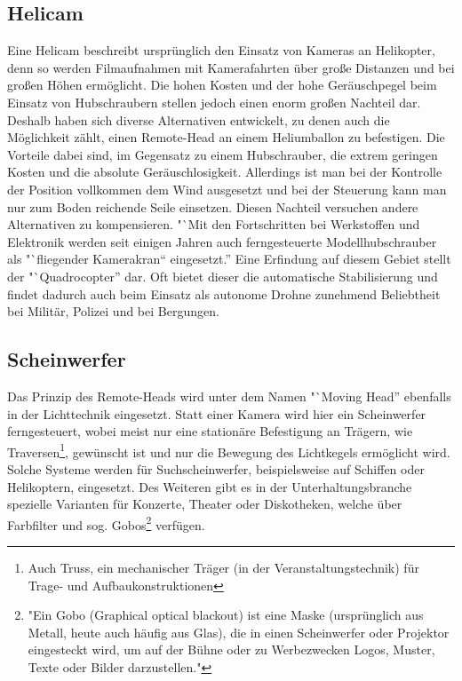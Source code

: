 \documentclass[a4paper, 12pt, bibliography=totocnumbered, listof=numbered]{scrartcl}
\begin{document}
	\subsection{Helicam}
	Eine Helicam beschreibt ursprünglich den Einsatz von Kameras an Helikopter, denn so werden Filmaufnahmen mit Kamerafahrten über große Distanzen und bei großen Höhen ermöglicht. Die hohen Kosten und der hohe Geräuschpegel beim Einsatz von Hubschraubern stellen jedoch einen enorm großen Nachteil dar. Deshalb haben sich diverse Alternativen entwickelt, zu denen auch die Möglichkeit zählt, einen Remote-Head an einem Heliumballon zu befestigen. Die Vorteile dabei sind, im Gegensatz zu einem Hubschrauber, die extrem geringen Kosten und die absolute Geräuschlosigkeit. Allerdings ist man bei der Kontrolle der Position vollkommen dem Wind ausgesetzt und bei der Steuerung kann man nur zum Boden reichende Seile einsetzen. Diesen Nachteil versuchen andere Alternativen zu kompensieren. "`Mit den Fortschritten bei Werkstoffen und Elektronik werden seit einigen Jahren auch ferngesteuerte Modellhubschrauber als "`fliegender Kamerakran“ eingesetzt.”\cite{wikipedia-kamerakran} Eine Erfindung auf diesem Gebiet stellt der "`Quadrocopter” dar. Oft bietet dieser die automatische Stabilisierung und findet dadurch auch beim Einsatz als autonome Drohne zunehmend Beliebtheit bei Militär, Polizei und bei Bergungen.

	\subsection{Scheinwerfer}
	Das Prinzip des Remote-Heads wird unter dem Namen "`Moving Head” ebenfalls in der Lichttechnik eingesetzt. Statt einer Kamera wird hier ein Scheinwerfer ferngesteuert, wobei meist nur eine stationäre Befestigung an Trägern, wie Traversen\footnote{Auch Truss, ein mechanischer Träger (in der Veranstaltungstechnik) für Trage- und Aufbaukonstruktionen\cite{wikipedia-traverse}}, gewünscht ist und nur die Bewegung des Lichtkegels ermöglicht wird. Solche Systeme werden für Suchscheinwerfer, beispielsweise auf Schiffen oder Helikoptern, eingesetzt. Des Weiteren gibt es in der Unterhaltungsbranche spezielle Varianten für Konzerte, Theater oder Diskotheken, welche über Farbfilter und sog. Gobos\footnote{"Ein Gobo (Graphical optical blackout) ist eine Maske (ursprünglich aus Metall, heute auch häufig aus Glas), die in einen Scheinwerfer oder Projektor eingesteckt wird, um auf der Bühne oder zu Werbezwecken Logos, Muster, Texte oder Bilder darzustellen."\cite{wikipedia-gobo}} verfügen.
\end{document}
